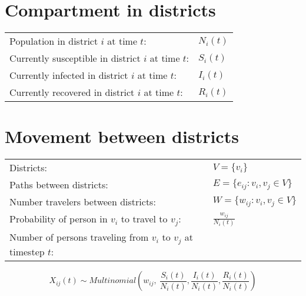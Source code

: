 \documentclass[preprint,12pt]{elsarticle}
\begin{document}
\renewcommand{\arraystretch}{1,5}
\section{Compartment in districts}
\noindent\begin{tabular}[t]{@{}p{9cm}p{7cm}}
Population in district $i$ at time $t$: &$N_i(t)$ \\
Currently susceptible in district $i$ at time $t$: &$S_i(t)$ \\
Currently infected in district $i$ at time $t$: &$I_i(t)$ \\
Currently recovered in district $i$ at time $t$:
&$R_i(t)$

\end{tabular}

\section{Movement between districts}
\noindent\begin{tabular}[t]{@{}p{9cm}p{7cm}}

Districts: &$V=\{v_i\}$ \\
Paths between districts: &$E=\{e_{ij}:v_i,v_j\in V \}$ \\
Number travelers between districts: &$W=\{w_{ij}:v_i,v_j\in V\}$ \\
Probability of person in $v_i$ to travel to $v_j$: &$\frac{w_{ij}}{N_i(t)}$ \\
Number of persons traveling from $v_i$ to $v_j$ at timestep $t$:
\end{tabular}


\begin{equation*}
X_{ij}\left(t\right)\sim Multinomial\left(w_{ij},\ \frac{S_i\left(t\right)}{N_i\left(t\right)},\frac{I_i\left(t\right)}{N_i\left(t\right)},\frac{R_i\left(t\right)}{N_i\left(t\right)}\right)
\end{equation*}
\end{document}
